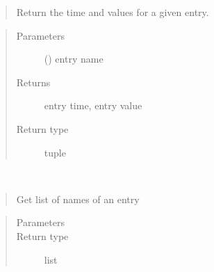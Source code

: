 \documentclass[letterpaper,10pt,english]{sphinxmanual}
\begin{document}
\begin{fulllineitems}
\begin{fulllineitems}
\begin{quote}
Return the time and values for a given entry.
\end{quote}
\begin{quote}\begin{description}
\item[{Parameters}] \leavevmode
{} () \textendash{} entry name

\item[{Returns}] \leavevmode
entry time, entry value

\item[{Return type}] \leavevmode
tuple

\end{description}\end{quote}

\end{fulllineitems}


\begin{fulllineitems}
\label{\detokenize{yaocptool.modelling:yaocptool.modelling.dataset.DataSet.get_entry_names}}~\begin{quote}

Get list of names of an entry
\end{quote}
\begin{quote}\begin{description}
\item[{Parameters}] \leavevmode
{} \textendash{} 

\item[{Return type}] \leavevmode
list

\end{description}\end{quote}

\end{fulllineitems}


\begin{fulllineitems}
\label{\detokenize{yaocptool.modelling:yaocptool.modelling.dataset.DataSet.get_entry_size}}~\begin{quote}


\end{quote}
\end{fulllineitems}
\end{fulllineitems}
\end{document}
